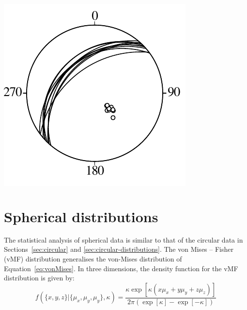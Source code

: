 \begin{enumerate}
\noindent\begin{minipage}[t][][b]{.3\linewidth}
\includegraphics[]{../figures/fault.pdf}\medskip
\end{minipage}
\begin{minipage}[t][][t]{.7\linewidth}
  \label{fig:fault}
\end{minipage}

\end{enumerate}

\section{Spherical distributions}
\label{sec:spherical-distributions}

The statistical analysis of spherical data is similar to that of the
circular data in Sections~\ref{sec:circular} and
\ref{sec:circular-distributions}. The von Mises -- Fisher (vMF)
distribution generalises the von-Mises distribution of
Equation~\ref{eq:vonMises}.  In three dimensions, the density function
for the vMF distribution is given by:
\begin{equation}
  f(\{x,y,z\}|\{\mu_x,\mu_y,\mu_y\},\kappa) = \frac{\kappa\exp[\kappa
      (x\mu_x+y\mu_y+z\mu_z)]}{2\pi(\exp[\kappa]-\exp[-\kappa])}
  \label{eq:vonMisesFisher}
\end{equation}

